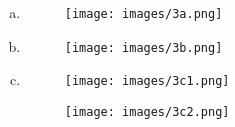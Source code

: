 \documentclass{article}
\begin{document}
\begin{enumerate}[a)]
    \item \text{}
    \begin{figure}[H]
        \centering
        \texttt{[image: images/3a.png]}
        \caption{}
        \label{fig:3a}
    \end{figure}
    
    \item\text{}
    \begin{figure}[H]
        \centering
        \texttt{[image: images/3b.png]}
        \caption{}
        \label{fig:3b}
    \end{figure}

    \item\text{}
    \begin{figure}[H]
        \centering
        \texttt{[image: images/3c1.png]}
        \caption{}
        \label{fig:3c1}
    \end{figure}

    \begin{figure}[H]
        \centering
        \texttt{[image: images/3c2.png]}
        \caption{}
        \label{fig:3c2}
    \end{figure}
\end{enumerate}
\end{document}
